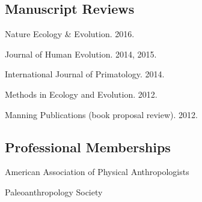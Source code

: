 \documentclass{article}
\begin{document}
\subsection*{Manuscript Reviews}
\begin{description*}
\item[] Nature Ecology \& Evolution. 2016.
\item[] Journal of Human Evolution. 2014, 2015.
\item[] International Journal of Primatology. 2014.
\item[] Methods in Ecology and Evolution. 2012.
\item[] Manning Publications (book proposal review). 2012.
\end{description*}
\subsection*{Professional Memberships}
\begin{description*}
\item[] American Association of Physical Anthropologists
\item[] Paleoanthropology Society
\end{description*}
\end{document}
